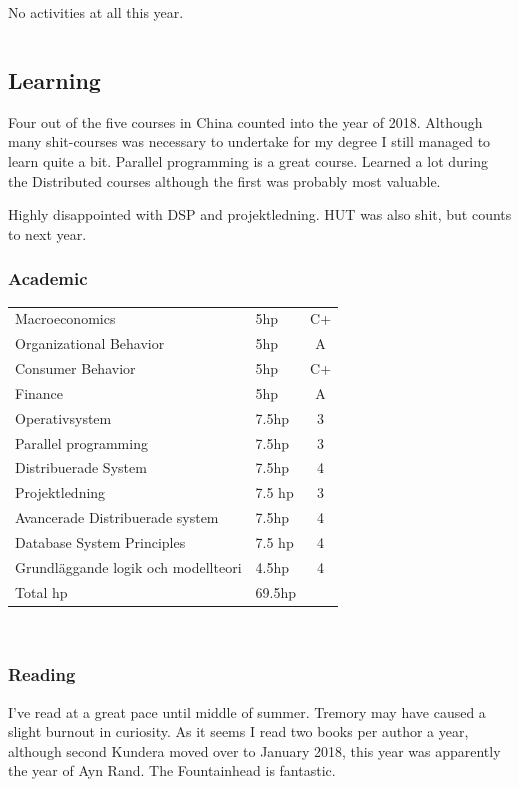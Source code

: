 \documentclass[a4paper]{article}
\begin{document}
	No activities at all this year.
	
	\begin{tabular}{l|c|c|c|c}
		
	\end{tabular}
	
	\subsection{Learning}
	
	Four out of the five courses in China counted into the year of 2018.
	Although many shit-courses was necessary to undertake for my degree
	I still managed to learn quite a bit. Parallel programming is a great
	course. Learned a lot during the Distributed courses although the first
	was probably most valuable.
	
	Highly disappointed with DSP and projektledning.
	HUT was also shit, but counts to next year.
	
	\subsubsection{Academic}
	\begin{tabular}{l|l|c}
		Macroeconomics & 5hp & C+\\
		Organizational Behavior & 5hp & A\\
		Consumer Behavior & 5hp & C+\\
		Finance & 5hp & A \\
		Operativsystem & 7.5hp & 3 \\
		Parallel programming & 7.5hp & 3 \\
		Distribuerade System & 7.5hp & 4 \\
		Projektledning & 7.5 hp & 3 \\
		Avancerade Distribuerade system & 7.5hp & 4 \\
		Database System Principles & 7.5 hp & 4 \\
		Grundläggande logik och modellteori & 4.5hp & 4
		
		\\
		Total hp & 69.5hp  
	\end{tabular} \\ 
	
	\subsubsection{Reading}
	
	I've read at a great pace until middle of summer. Tremory may have caused a slight burnout in curiosity. 
	As it seems I read two books per author a year, although second Kundera moved over to January 2018, 
	this year was apparently the year of Ayn Rand. The Fountainhead is fantastic. 
	
\end{document}
